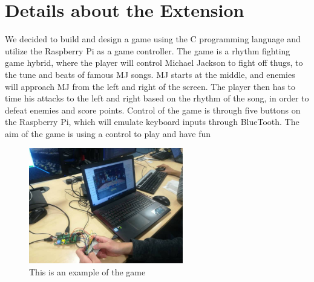 \documentclass[a4paper]{article}
\begin{document}
\section{Details about the Extension}
We decided to build and design a game using the C programming language and utilize the Raspberry Pi as a game controller. The game is a rhythm fighting game hybrid, where the player will control Michael Jackson to fight off thugs, to the tune and beats of famous MJ songs. MJ starts at the middle, and enemies will approach MJ from the left and right of the screen. The player then has to time his attacks to the left and right based on the rhythm of the song, in order to defeat enemies and score points. Control of the game is through five buttons on the Raspberry Pi, which will emulate keyboard inputs through BlueTooth. The aim of the game is using a control to play and have fun
\begin{figure}[h]
\centering
\includegraphics[width=0.6\textwidth]{game.jpg}
\caption{\label{fig:pi}This is an example of the game}
\end{figure}
\end{document}
